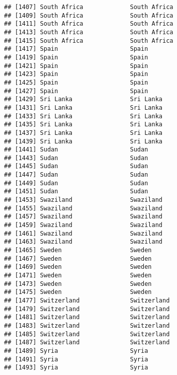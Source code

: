 \documentclass[]{article}
\begin{document}
\begin{verbatim}
## [1407] South Africa             South Africa            
## [1409] South Africa             South Africa            
## [1411] South Africa             South Africa            
## [1413] South Africa             South Africa            
## [1415] South Africa             South Africa            
## [1417] Spain                    Spain                   
## [1419] Spain                    Spain                   
## [1421] Spain                    Spain                   
## [1423] Spain                    Spain                   
## [1425] Spain                    Spain                   
## [1427] Spain                    Spain                   
## [1429] Sri Lanka                Sri Lanka               
## [1431] Sri Lanka                Sri Lanka               
## [1433] Sri Lanka                Sri Lanka               
## [1435] Sri Lanka                Sri Lanka               
## [1437] Sri Lanka                Sri Lanka               
## [1439] Sri Lanka                Sri Lanka               
## [1441] Sudan                    Sudan                   
## [1443] Sudan                    Sudan                   
## [1445] Sudan                    Sudan                   
## [1447] Sudan                    Sudan                   
## [1449] Sudan                    Sudan                   
## [1451] Sudan                    Sudan                   
## [1453] Swaziland                Swaziland               
## [1455] Swaziland                Swaziland               
## [1457] Swaziland                Swaziland               
## [1459] Swaziland                Swaziland               
## [1461] Swaziland                Swaziland               
## [1463] Swaziland                Swaziland               
## [1465] Sweden                   Sweden                  
## [1467] Sweden                   Sweden                  
## [1469] Sweden                   Sweden                  
## [1471] Sweden                   Sweden                  
## [1473] Sweden                   Sweden                  
## [1475] Sweden                   Sweden                  
## [1477] Switzerland              Switzerland             
## [1479] Switzerland              Switzerland             
## [1481] Switzerland              Switzerland             
## [1483] Switzerland              Switzerland             
## [1485] Switzerland              Switzerland             
## [1487] Switzerland              Switzerland             
## [1489] Syria                    Syria                   
## [1491] Syria                    Syria                   
## [1493] Syria                    Syria                   

\end{verbatim}
\end{document}
